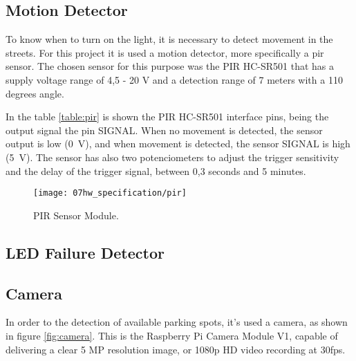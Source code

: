 \clearpage
\subsection{Motion Detector}
To know when to turn on the light, it is necessary to detect movement in the streets. For this project it is used a motion detector, more specifically a \ac{pir} sensor. The chosen sensor for this purpose was the PIR HC-SR501 that has a supply voltage range of 4,5 - 20 V and a detection range of 7 meters with a 110 degrees angle.

In the table \ref{table:pir} is shown the PIR HC-SR501 interface pins, being the output signal the pin SIGNAL. When no movement is detected, the sensor output is low (0~V), and when movement is detected, the sensor SIGNAL is high (5~V). The sensor has also two potenciometers to adjust the trigger sensitivity and the delay of the trigger signal, between 0,3 seconds and 5 minutes.

\begin{figure}[H]
	\centering
	\texttt{[image: 07hw\_specification/pir]}
	\caption{PIR Sensor Module.}
	\label{fig:pir}
\end{figure}

\begin{table}[H]
	\centering
	
	\caption{PIR Module Interface Pins.}
	\label{table:pir}
\end{table}

\subsection{LED Failure Detector}

\subsection{Camera}
In order to the detection of available parking spots, it's used a camera, as shown in figure \ref{fig:camera}. This is the Raspberry Pi Camera Module V1, capable of delivering a clear 5 MP resolution image, or 1080p HD video recording at 30fps. \cite{camera}

